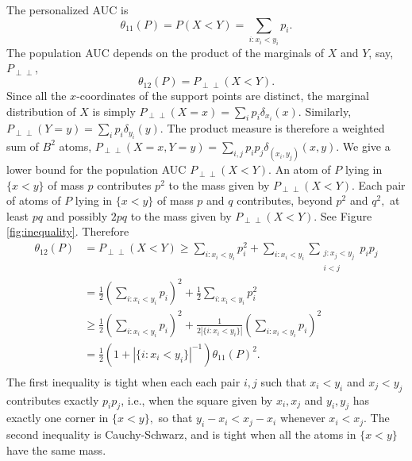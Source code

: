 \documentclass[12pt]{article}
\DeclareMathOperator{\AUC}{AUC}
\renewcommand{\P}{P}
\newcommand{\cind}{\perp \!\!\! \perp}
\newcommand{\aucindiv}{\theta_{11}}%
\newcommand{\aucpop}{\theta_{12}}%
\newcommand{\Pind}{P_{\cind}}
\begin{document}
The personalized AUC is
$$\aucindiv(P)=\P(X<Y)=\underset{i:x_i<y_i}{\sum} p_i.$$
The population AUC depends on the product of the marginals  of $X$ and
$Y$, say, $\Pind$,
$$\theta_{12}(\P)=\Pind(X<Y).$$
Since all the $x$-coordinates of the support points are distinct, the
marginal distribution of $X$ is simply
$\Pind(X=x)=\sum_i p_i\delta_{x_i}(x)$. Similarly,
$\Pind(Y=y)=\sum_i p_i\delta_{y_i}(y).$ The product measure is
therefore a weighted sum of $B^2$ atoms,
$\Pind(X=x,Y=y)=\sum_{i,j}p_ip_j\delta_{(x_i,y_j)}(x,y)$. We give a
lower bound for the population AUC $\Pind(X<Y)$. An atom of $\P$ lying
in $\{x<y\}$ of mass $p$ contributes $p^2$ to the mass given by
$\Pind(X<Y)$. Each pair of atoms of $\P$ lying in $\{x<y\}$ of mass
$p$ and $q$ contributes, beyond $p^2$ and $q^2,$ at least $pq$ and possibly $2pq$ to the mass
given by $\Pind(X<Y)$. See Figure \ref{fig:inequality}. %
Therefore
\begin{align}
  \aucpop(\P)&=\Pind(X<Y) \ge \sum_{i:x_i<y_i} p_i^2 +
           \sum_{i:x_i<y_i}\underset{\substack{j:x_j<y_j\\i<j}}{\sum} p_ip_j\\
         &= \frac{1}{2}\left(\underset{i:x_i<y_i}{\sum} p_i\right)^2 +
           \frac{1}{2}\underset{i:x_i<y_i}{\sum} p_i^2\\
         &\ge \frac{1}{2}\left(\underset{i:x_i<y_i}{\sum} p_i\right)^2 +
           \frac{1}{2|\{i:x_i<y_i\}|}\left(\underset{i:x_i<y_i}{\sum} p_i\right)^2\\
         &= \frac{1}{2}(1+|\{i:x_i<y_i\}|^{-1})\aucindiv(\P)^2.\\
\end{align}
The first inequality is tight when each each pair $i,j$ such that
$x_i<y_i$ and $x_j<y_j$ contributes exactly $p_ip_j$, i.e., when the
square given by $x_i,x_j$ and $y_i,y_j$ has exactly one corner in
$\{x<y\},$ so that $y_i-x_i < x_j-x_i$ whenever $x_i<x_j$. The second inequality is Cauchy-Schwarz, and is
tight when all the atoms in $\{x<y\}$ have the same mass.
\end{document}
